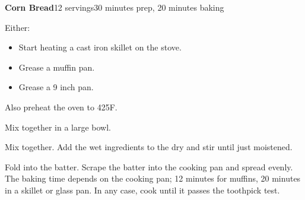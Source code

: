 \documentclass[../Cookbook.tex]{subfiles}
\begin{document}
\begin{recipe}{\textbf{Corn Bread}}{12 servings}{30 minutes prep, 20 minutes baking}

  Either:
  \begin{itemize}
    \item Start heating a cast iron skillet on the stove.
    \item Grease a muffin pan.
    \item Grease a 9 inch pan.
  \end{itemize}
  Also preheat the oven to 425\0F.

  Mix together in a large bowl.

  Mix together.
  Add the wet ingredients to the dry and stir until just moistened.

  Fold into the batter.
  Scrape the batter into the cooking pan and spread evenly.
  The baking time depends on the cooking pan; 12 minutes for muffins, 20 minutes in a skillet or glass pan.
  In any case, cook until it passes the toothpick test.

\end{recipe}
\end{document}
